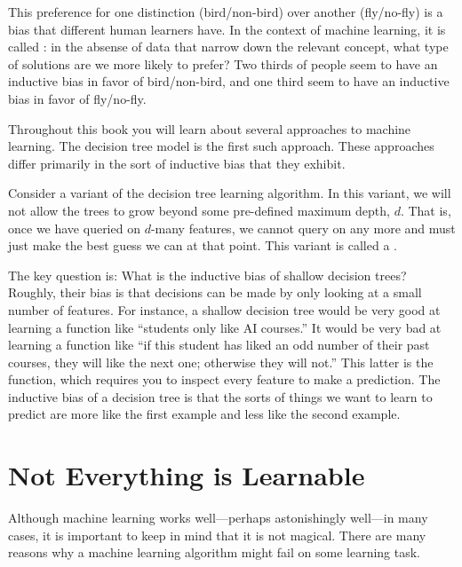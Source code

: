 This preference for one distinction (bird/non-bird) over another
(fly/no-fly) is a bias that different human learners have.  In the
context of machine learning, it is called : in
the absense of data that narrow down the relevant concept, what type
of solutions are we more likely to prefer?  Two thirds of people seem
to have an inductive bias in favor of bird/non-bird, and one third
seem to have an inductive bias in favor of fly/no-fly.


Throughout this book you will learn about several approaches to
machine learning.  The decision tree model is the first such
approach.  These approaches differ primarily in the sort of inductive
bias that they exhibit.

Consider a variant of the decision tree learning algorithm.  In this
variant, we will not allow the trees to grow beyond some pre-defined
maximum depth, $d$.  That is, once we have queried on $d$-many
features, we cannot query on any more and must just make the best
guess we can at that point.  This variant is called a .

The key question is: What is the inductive bias of shallow decision
trees?  Roughly, their bias is that decisions can be made by only
looking at a small number of features.  For instance, a shallow
decision tree would be very good at learning a function like
``students only like AI courses.''  It would be very bad at learning a
function like ``if this student has liked an odd number of their past
courses, they will like the next one; otherwise they will not.''  This
latter is the  function, which requires you to inspect
every feature to make a prediction.  The inductive bias of a decision
tree is that the sorts of things we want to learn to predict are more
like the first example and less like the second example.

\section{Not Everything is Learnable}

Although machine learning works well---perhaps astonishingly well---in
many cases, it is important to keep in mind that it is not magical.
There are many reasons why a machine learning algorithm might fail on
some learning task.


